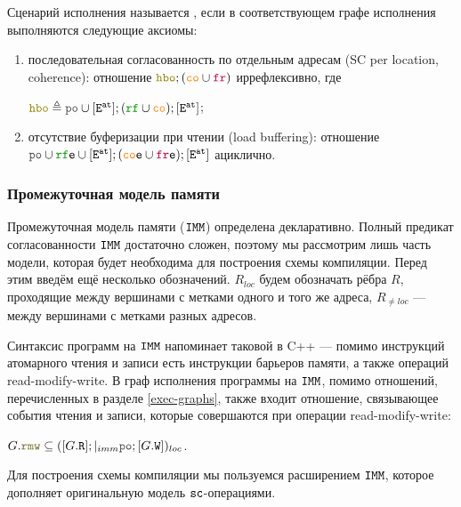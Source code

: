 \begin{defn}\label{def:omm-consistent}
  Сценарий исполнения называется , если в соответствующем графе исполнения выполняются следующие аксиомы:

  \begin{enumerate}
  \item последовательная согласованность по отдельным адресам (SC per location, coherence): отношение $\lHBO ; (\lCO \cup \lFR)$ иррефлексивно, где

    $\lHBO \defeq \lPO \cup [\lE^{\at}] ; (\lRF \cup \lCO) ; [\lE^{\at}]$;
    
  \item отсутствие буферизации при чтении (load buffering): отношение $\lPO \cup \lRFE \cup [\lE^{\at}] ; (\lCOE \cup \lFRE) ; [\lE^{\at}]$ ациклично.
  \end{enumerate}
\end{defn}

\subsubsection{Промежуточная модель памяти}

Промежуточная модель памяти ($\mathtt{IMM}$) определена декларативно. Полный предикат согласованности $\mathtt{IMM}$ достаточно сложен, поэтому мы рассмотрим лишь часть модели, которая будет необходима для построения схемы компиляции. Перед этим введём ещё несколько обозначений. $R_{loc}$ будем обозначать рёбра $R$, проходящие между вершинами с метками одного и того же адреса, $R_{\neq loc}$ --- между вершинами с метками разных адресов.

Синтаксис программ на $\mathtt{IMM}$ напоминает таковой в C++ --- помимо инструкций атомарного чтения и записи есть инструкции барьеров памяти, а также операций read-modify-write. В граф исполнения программы на $\mathtt{IMM}$, помимо отношений, перечисленных в разделе \ref{exec-graphs}, также входит отношение, связывающее события чтения и записи, которые совершаются при операции read-modify-write:

$G.\lRMW \subseteq ([G.\lR] ;\imm \lPO;[G.\lW])_{loc}$. 

Для построения схемы компиляции мы пользуемся расширением \cite{imm-sc} $\mathtt{IMM}$, которое дополняет оригинальную модель \cite{imm} ${\mathtt{sc}}$-операциями. 

